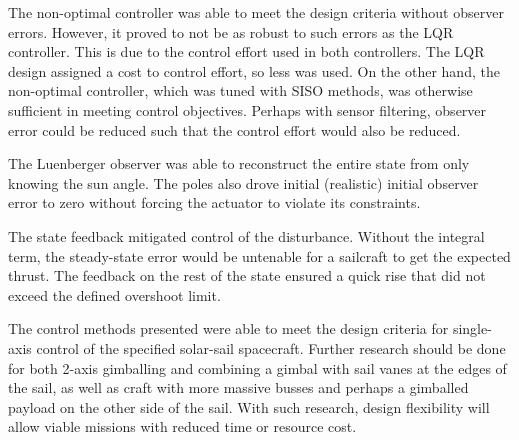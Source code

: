 \documentclass[]{aiaa-tc}%
\begin{document}
	The non-optimal controller was able to meet the design criteria without observer errors. However, it proved to not be as robust to such errors as the LQR controller. This is due to the control effort used in both controllers. The LQR design assigned a cost to control effort, so less was used. On the other hand, the non-optimal controller, which was tuned with SISO methods, was otherwise sufficient in meeting control objectives. Perhaps with sensor filtering, observer error could be reduced such that the control effort would also be reduced. 

	\vspace{5 mm}

	The Luenberger observer was able to reconstruct the entire state from only knowing the sun angle. The poles also drove initial (realistic) initial observer error to zero without forcing the actuator to violate its constraints.

	\vspace{5 mm}

	The state feedback mitigated control of the disturbance. Without the integral term, the steady-state error would be untenable for a sailcraft to get the expected thrust.  The feedback on the rest of the state ensured a quick rise that did not exceed the defined overshoot limit.

	\vspace{5 mm}

	The control methods presented were able to meet the design criteria for single-axis control of the specified solar-sail spacecraft. Further research should be done for both 2-axis gimballing and combining a gimbal with sail vanes at the edges of the sail, as well as craft with more massive busses and perhaps a gimballed payload on the other side of the sail. With such research, design flexibility will allow viable missions with reduced time or resource cost.



%    
    
\end{document}
